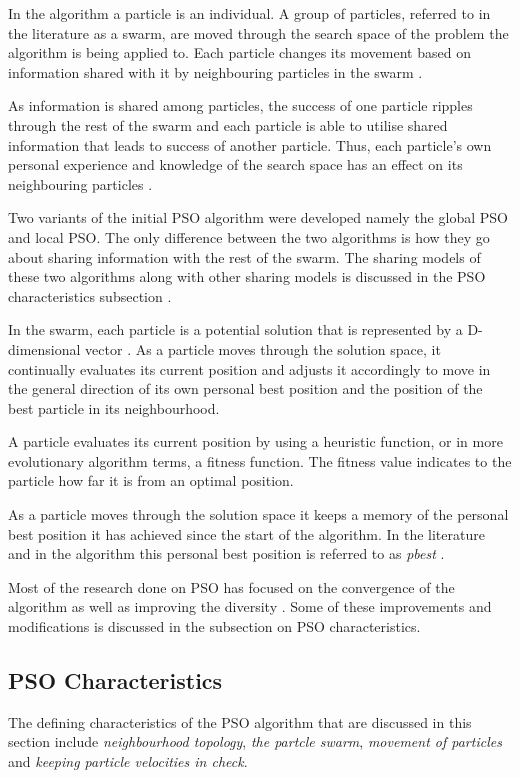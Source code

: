 In the algorithm a particle is an individual. A group of particles, referred to in the literature as a swarm,  are moved through the search space of the problem the algorithm is being applied to. Each particle changes its movement based on information shared with it by neighbouring particles in the swarm \cite{FundamentalSwarm,CompuIntelligenceIntro}. 

As information is shared among particles, the success of one particle ripples through the rest of the swarm and each particle is able to utilise shared information that leads to success of another particle. Thus, each particle's own personal experience and knowledge of the search space has an effect on its neighbouring particles \cite{FundamentalSwarm,CompuIntelligenceIntro}.

Two variants of the initial PSO algorithm were developed namely the global PSO and local PSO. The only difference between the two algorithms is how they go about sharing information with the rest of the swarm. The sharing models of these two algorithms along with other sharing models is discussed in the PSO characteristics subsection \cite{SOSwarm}.

In the swarm, each particle is a potential solution that is represented by a D-dimensional vector \cite{PSOHybridJobShop,PSOSelfHierarch}. As a particle moves through the solution space, it continually evaluates its current position and adjusts it accordingly to move in the general direction of its own personal best position and the position of the best particle in its neighbourhood. 

A particle evaluates its current position by using a heuristic function, or in more evolutionary algorithm terms, a fitness function. The fitness value indicates to the particle how far it is from an optimal position\cite{CompuIntelligenceIntro}. 

As a particle moves through the solution space it keeps a memory of the personal best position it has achieved since the start of the algorithm. In the literature and in the algorithm this personal best position is referred to as \emph{pbest} \cite{SOSwarm}.

Most of the research done on PSO has focused on the convergence of the algorithm as well as improving the diversity \cite{FundamentalSwarm}. Some of these improvements and modifications is discussed in the subsection on PSO characteristics.

\subsection{PSO Characteristics}
\label{sec:psocharacteristics}
The defining characteristics of the PSO algorithm that are discussed in this section include \emph{neighbourhood topology}, \emph{the partcle swarm}, \emph{movement of particles} and \emph{keeping particle velocities in check}.
